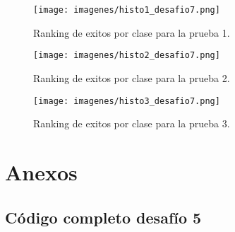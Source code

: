 \documentclass[es,gi]{ifirak}\usepackage[]{graphicx}\usepackage[]{color}
\begin{document}
\begin{figure}[hbtp]
\centering
\texttt{[image: imagenes/histo1\_desafio7.png]}
\caption{Ranking de exitos por clase para la prueba 1.}
\texttt{[image: imagenes/histo2\_desafio7.png]}
\caption{Ranking de exitos por clase para la prueba 2.}
\texttt{[image: imagenes/histo3\_desafio7.png]}
\caption{Ranking de exitos por clase para la prueba 3.}
\end{figure}

\pagebreak
\section{Anexos}
\subsection{Código completo desafío 5}
\end{document}

